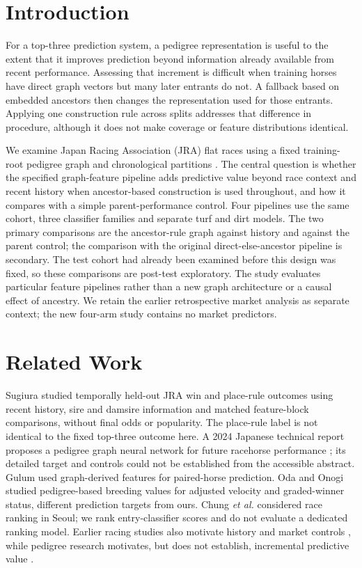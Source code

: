 \section{Introduction}
For a top-three prediction system, a pedigree representation is useful to the extent that it improves prediction beyond information already available from recent performance. Assessing that increment is difficult when training horses have direct graph vectors but many later entrants do not. A fallback based on embedded ancestors then changes the representation used for those entrants. Applying one construction rule across splits addresses that difference in procedure, although it does not make coverage or feature distributions identical.

We examine Japan Racing Association (JRA) flat races using a fixed training-root pedigree graph and chronological partitions \cite{jraResults,netkeibaRace,netkeibaDb,grover2016}. The central question is whether the specified graph-feature pipeline adds predictive value beyond race context and recent history when ancestor-based construction is used throughout, and how it compares with a simple parent-performance control. Four pipelines use the same cohort, three classifier families and separate turf and dirt models. The two primary comparisons are the ancestor-rule graph against history and against the parent control; the comparison with the original direct-else-ancestor pipeline is secondary. The test cohort had already been examined before this design was fixed, so these comparisons are post-test exploratory. The study evaluates particular feature pipelines rather than a new graph architecture or a causal effect of ancestry. We retain the earlier retrospective market analysis as separate context; the new four-arm study contains no market predictors.

\section{Related Work}
Sugiura \cite{sugiura2026} studied temporally held-out JRA win and place-rule outcomes using recent history, sire and damsire information and matched feature-block comparisons, without final odds or popularity. The place-rule label is not identical to the fixed top-three outcome here. A 2024 Japanese technical report proposes a pedigree graph neural network for future racehorse performance \cite{oikawa2024}; its detailed target and controls could not be established from the accessible abstract. Gulum \cite{gulum2018} used graph-derived features for paired-horse prediction. Oda and Onogi \cite{oda2024} studied pedigree-based breeding values for adjusted velocity and graded-winner status, different prediction targets from ours. Chung \emph{et al.} \cite{chung2024} considered race ranking in Seoul; we rank entry-classifier scores and do not evaluate a dedicated ranking model. Earlier racing studies also motivate history and market controls \cite{silverman2013,pudaruth2013}, while pedigree research motivates, but does not establish, incremental predictive value \cite{bailey2022}.

